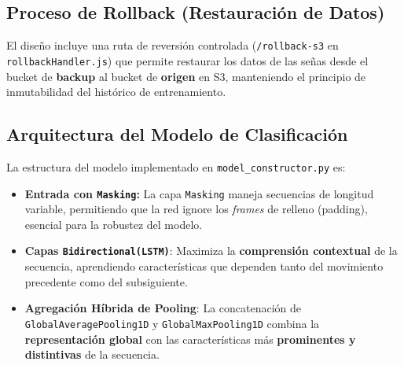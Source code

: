 \subsection{Proceso de Rollback (Restauración de Datos)}
El diseño incluye una ruta de reversión controlada (\texttt{/rollback-s3} en \texttt{rollbackHandler.js}) que permite restaurar los datos de las señas desde el bucket de \textbf{backup} al bucket de \textbf{origen} en S3, manteniendo el principio de inmutabilidad del histórico de entrenamiento.

\subsection{Arquitectura del Modelo de Clasificación}
La estructura del modelo implementado en \texttt{model\_constructor.py} es:

\begin{itemize}
    \item \textbf{Entrada con \texttt{Masking}:} La capa \texttt{Masking} maneja secuencias de longitud variable, permitiendo que la red ignore los \textit{frames} de relleno (padding), esencial para la robustez del modelo.
    \item \textbf{Capas \texttt{Bidirectional(LSTM)}}: Maximiza la \textbf{comprensión contextual} de la secuencia, aprendiendo características que dependen tanto del movimiento precedente como del subsiguiente.
    \item \textbf{Agregación Híbrida de Pooling}: La concatenación de \texttt{GlobalAveragePooling1D} y \texttt{GlobalMaxPooling1D} combina la \textbf{representación global} con las características más \textbf{prominentes y distintivas} de la secuencia.
\end{itemize}

